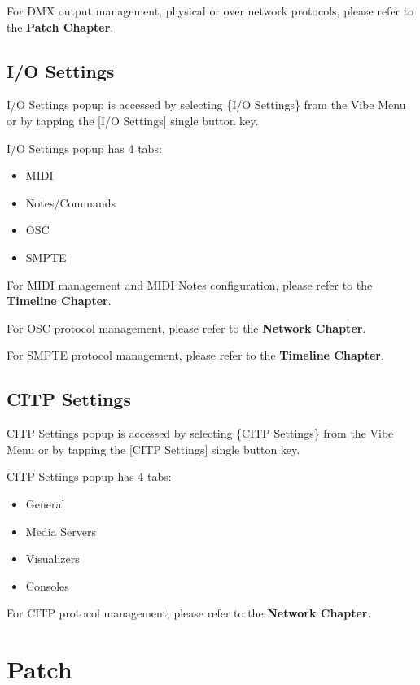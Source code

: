 \documentclass[
]{article}
\begin{document}
For DMX output management, physical or over network protocols, please refer to the \textbf{Patch Chapter}.

\hypertarget{I-O-Settings-4.4}{%
\subsection{I/O Settings}\label{I-O-Settings-4.4}}

I/O Settings popup is accessed by selecting \{I/O Settings\} from the Vibe Menu or by tapping the {[}I/O Settings{]} single button key.

I/O Settings popup has 4 tabs:

\begin{itemize}
\item
  MIDI
\item
  Notes/Commands
\item
  OSC
\item
  SMPTE
\end{itemize}

For MIDI management and MIDI Notes configuration, please refer to the \textbf{Timeline Chapter}.

For OSC protocol management, please refer to the \textbf{Network Chapter}.

For SMPTE protocol management, please refer to the \textbf{Timeline Chapter}.

\hypertarget{CITP-Settings-4.5}{%
\subsection{CITP Settings}\label{CITP-Settings-4.5}}

CITP Settings popup is accessed by selecting \{CITP Settings\} from the Vibe Menu or by tapping the {[}CITP Settings{]} single button key.

CITP Settings popup has 4 tabs:

\begin{itemize}
\item
  General
\item
  Media Servers
\item
  Visualizers
\item
  Consoles
\end{itemize}

For CITP protocol management, please refer to the \textbf{Network Chapter}.

\hypertarget{patch}{%
\section{Patch}\label{patch}}
\end{document}

